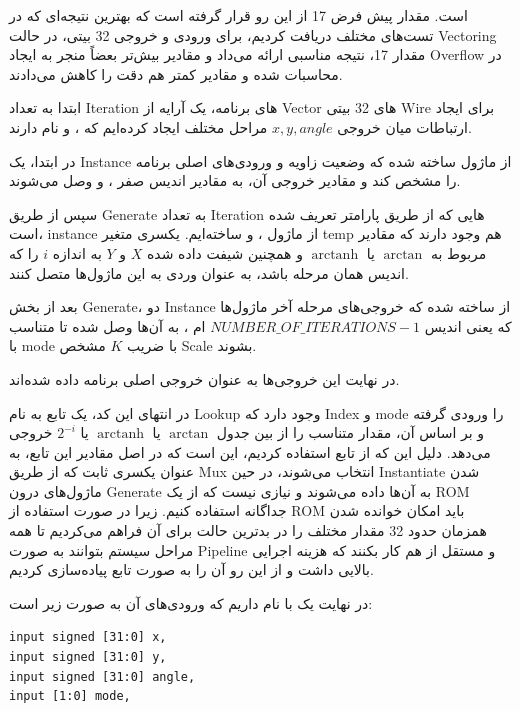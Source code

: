 \documentclass[12pt,titlepage,a4page , tikz , multi,table , svgnames,xcdraw]{article}
\DeclareMathOperator\arctanh{arctanh}
\begin{document}
است. مقدار پیش فرض 17 از این رو قرار گرفته است که بهترین نتیجه‌ای که در تست‌های مختلف دریافت کردیم، برای ورودی و خروجی 32 بیتی، در حالت Vectoring مقدار 17، نتیجه مناسبی ارائه می‌داد و مقادیر بیش‌تر بعضاً منجر به ایجاد Overflow در محاسبات شده و مقادیر کمتر هم دقت را کاهش می‌دادند.


ابتدا به تعداد Iteration های برنامه، یک آرایه از Vector های 32 بیتی Wire برای ایجاد ارتباطات میان خروجی $x,y,angle$ مراحل مختلف ایجاد کرده‌ایم که ،  و  نام دارند.

در ابتدا، یک Instance از ماژول  ساخته شده که وضعیت زاویه و ورودی‌های اصلی برنامه را مشخص کند و مقادیر خروجی آن، به مقادیر اندیس صفر  ،  و  وصل می‌شوند.

سپس از طریق Generate به تعداد Iteration هایی که از طریق پارامتر تعریف شده است، instance از ماژول ،  و  ساخته‌ایم. یکسری متغیر temp هم وجود دارند که مقادیر مربوط به $\arctan$ یا $\arctanh$ و همچنین شیفت داده شده $X$ و $Y$ به اندازه $i$ را که اندیس همان مرحله باشد، به عنوان وردی به این ماژول‌ها متصل کنند.

بعد از بخش Generate، دو Instance از  ساخته شده که خروجی‌های مرحله آخر ماژول‌ها که یعنی اندیس
$NUMBER\_OF\_ITERATIONS - 1$
ام
 ،
   به آن‌ها وصل شده تا متناسب با mode با ضریب $K$ مشخص Scale بشوند.

در نهایت این خروجی‌ها به عنوان خروجی اصلی برنامه داده شده‌اند.

در انتهای این کد، یک تابع به نام Lookup وجود دارد که Index و mode را ورودی گرفته و بر اساس آن، مقدار متناسب را از بین جدول $\arctan$ یا $\arctanh$ یا $2^{-i}$ خروجی می‌دهد. دلیل این که از تابع استفاده کردیم، این است که در اصل مقادیر این تابع، به عنوان یکسری ثابت که از طریق Mux انتخاب می‌شوند، در حین Instantiate شدن ماژول‌های درون Generate به آن‌ها داده می‌شوند و نیازی نیست که از یک ROM جداگانه استفاده کنیم. زیرا در صورت استفاده از ROM باید امکان خوانده شدن همزمان حدود 32 مقدار مختلف را در بدترین حالت برای آن فراهم می‌کردیم تا همه مراحل سیستم بتوانند به صورت Pipeline و مستقل از هم کار بکنند که هزینه اجرایی بالایی داشت و از این رو آن را به صورت تابع پیاده‌سازی کردیم.


\hrulefill

\newpage
در نهایت یک  با نام  داریم که ورودی‌های آن به صورت زیر است:

\begin{latin}

\begin{verbatim}
input signed [31:0] x,
input signed [31:0] y,
input signed [31:0] angle,
input [1:0] mode,
   
\end{verbatim}

\end{latin}
\end{document}
